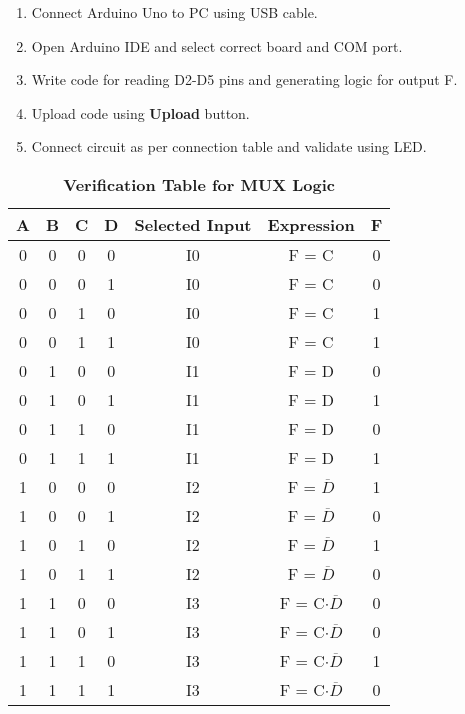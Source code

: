\documentclass[twocolumn]{article}
\begin{document}
\begin{enumerate}
    \item Connect Arduino Uno to PC using USB cable.
    \item Open Arduino IDE and select correct board and COM port.
    \item Write code for reading D2-D5 pins and generating logic for output F.
    \item Upload code using \textbf{Upload} button.
    \item Connect circuit as per connection table and validate using LED.
\end{enumerate}


\begin{table}[h]
\centering
\renewcommand{\arraystretch}{1.3}
\begin{tabular}{|c|c|c|c|c|c|c|}
\hline
A & B & C & D & Selected Input & Expression & F \\
\hline
0 & 0 & 0 & 0 & I0 & F = C             & 0 \\
0 & 0 & 0 & 1 & I0 & F = C             & 0 \\
0 & 0 & 1 & 0 & I0 & F = C             & 1 \\
0 & 0 & 1 & 1 & I0 & F = C             & 1 \\
0 & 1 & 0 & 0 & I1 & F = D             & 0 \\
0 & 1 & 0 & 1 & I1 & F = D             & 1 \\
0 & 1 & 1 & 0 & I1 & F = D             & 0 \\
0 & 1 & 1 & 1 & I1 & F = D             & 1 \\
1 & 0 & 0 & 0 & I2 & F = $\overline{D}$ & 1 \\
1 & 0 & 0 & 1 & I2 & F = $\overline{D}$ & 0 \\
1 & 0 & 1 & 0 & I2 & F = $\overline{D}$ & 1 \\
1 & 0 & 1 & 1 & I2 & F = $\overline{D}$ & 0 \\
1 & 1 & 0 & 0 & I3 & F = C$\cdot\overline{D}$ & 0 \\
1 & 1 & 0 & 1 & I3 & F = C$\cdot\overline{D}$ & 0 \\
1 & 1 & 1 & 0 & I3 & F = C$\cdot\overline{D}$ & 1 \\
1 & 1 & 1 & 1 & I3 & F = C$\cdot\overline{D}$ & 0 \\
\hline
\end{tabular}
\caption*{\textbf{Verification Table for MUX Logic}}
\end{table}
\end{document}
